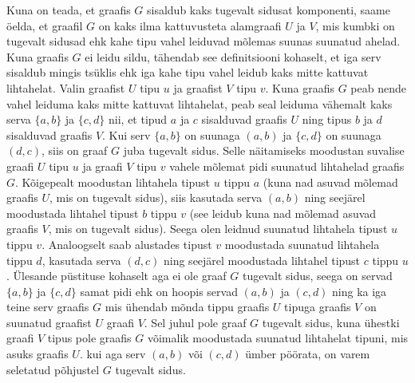 \documentclass{article}
\begin{document}
Kuna on teada, et graafis $G$ sisaldub kaks tugevalt sidusat komponenti, saame \"oelda, et graafil $G$ on kaks ilma kattuvusteta alamgraafi $U$ ja $V$, mis kumbki on tugevalt sidusad ehk kahe tipu vahel leiduvad m\~olemas suunas suunatud ahelad. Kuna graafis $G$ ei leidu sildu, tähendab see definitsiooni kohaselt, et iga serv sisaldub mingis ts\"uklis ehk iga kahe tipu vahel leidub kaks mitte kattuvat lihtahelat. Valin graafist $U$ tipu $u$ ja graafist $V$ tipu $v$. Kuna graafis $G$ peab nende vahel leiduma kaks mitte kattuvat lihtahelat, peab seal leiduma v\"ahemalt kaks serva $\{a,b\}$ ja $\{c,d\}$ nii, et tipud $a$ ja $c$ sisalduvad graafis $U$ ning tipus $b$ ja $d$ sisalduvad graafis $V$. Kui serv $\{a,b\}$ on suunaga $(a,b)$ ja $\{c,d\}$ on suunaga $(d,c)$, siis on graaf $G$ juba tugevalt sidus. Selle n\"aitamiseks moodustan suvalise graafi $U$ tipu $u$ ja graafi $V$ tipu $v$ vahele m\~olemat pidi suunatud lihtahelad graafis $G$. K\~oigepealt moodustan lihtahela tipust $u$ tippu $a$ (kuna nad asuvad m\~olemad graafis $U$, mis on tugevalt sidus), siis kasutada serva $(a,b)$ ning seej\"arel moodustada lihtahel tipust $b$ tippu $v$ (see leidub kuna nad m\~olemad asuvad graafis $V$, mis on tugevalt sidus). Seega olen leidnud suunatud lihtahela tipust $u$ tippu $v$. Analoogselt saab alustades tipust $v$ moodustada suunatud lihtahela tippu $d$, kasutada serva $(d,c)$ ning seej\"arel moodustada lihtahel tipust $c$ tippu $u$. \"Ulesande p\"ustituse kohaselt aga ei ole graaf $G$ tugevalt sidus, seega on servad $\{a,b\}$ ja $\{c,d\}$ samat pidi ehk on hoopis servad $(a,b)$ ja $(c,d)$ ning ka iga teine serv graafis $G$ mis \"uhendab m\~onda tippu graafis $U$ tipuga graafis $V$ on suunatud graafist $U$ graafi $V$. Sel juhul pole graaf $G$ tugevalt sidus, kuna \"uhestki graafi $V$ tipus pole graafis $G$ v\~oimalik moodustada suunatud lihtahelat tipuni, mis asuks graafis $U$. kui aga serv $(a,b)$ v\~oi $(c,d)$ \"umber p\"o\"orata, on varem seletatud p\~ohjustel $G$ tugevalt sidus.
\end{document}
